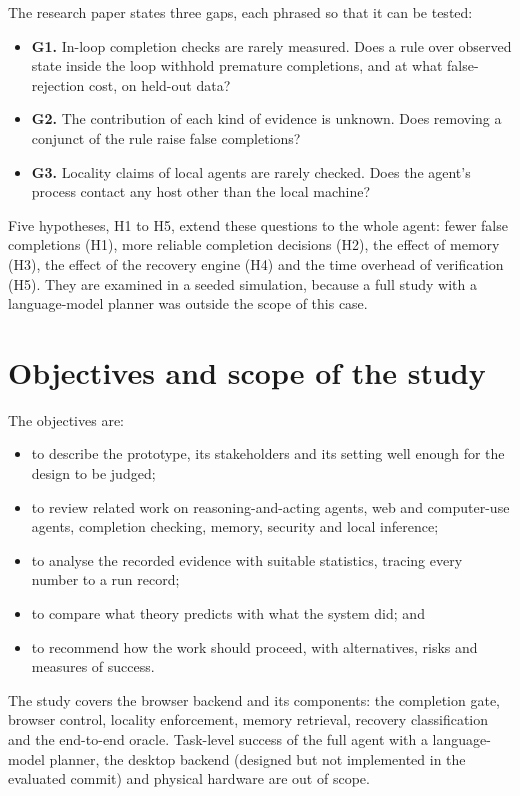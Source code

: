 The research paper states three gaps, each phrased so that it can be tested:
\begin{itemize}
\item \textbf{G1.} In-loop completion checks are rarely measured. Does a rule over observed state inside the loop withhold premature completions, and at what false-rejection cost, on held-out data?
\item \textbf{G2.} The contribution of each kind of evidence is unknown. Does removing a conjunct of the rule raise false completions?
\item \textbf{G3.} Locality claims of local agents are rarely checked. Does the agent's process contact any host other than the local machine?
\end{itemize}
Five hypotheses, H1 to H5, extend these questions to the whole agent: fewer false completions (H1), more reliable completion decisions (H2), the effect of memory (H3), the effect of the recovery engine (H4) and the time overhead of verification (H5). They are examined in a seeded simulation, because a full study with a language-model planner was outside the scope of this case.

\section{Objectives and scope of the study}

The objectives are:
\begin{itemize}
\item to describe the prototype, its stakeholders and its setting well enough for the design to be judged;
\item to review related work on reasoning-and-acting agents, web and computer-use agents, completion checking, memory, security and local inference;
\item to analyse the recorded evidence with suitable statistics, tracing every number to a run record;
\item to compare what theory predicts with what the system did; and
\item to recommend how the work should proceed, with alternatives, risks and measures of success.
\end{itemize}

The study covers the browser backend and its components: the completion gate, browser control, locality enforcement, memory retrieval, recovery classification and the end-to-end oracle. Task-level success of the full agent with a language-model planner, the desktop backend (designed but not implemented in the evaluated commit) and physical hardware are out of scope.

